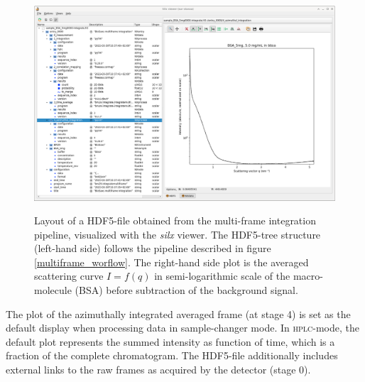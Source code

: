 \documentclass[preprint]{iucr}              %
\begin{document}
\begin{figure}
     \caption{Layout of a HDF5-file obtained from the multi-frame integration pipeline, visualized with the \textit{silx} viewer.
     The HDF5-tree structure (left-hand side) follows the pipeline described in figure \ref{multiframe_worflow}.
     The right-hand side plot is the averaged scattering curve $I=f(q)$ in semi-logarithmic scale of the macro-molecule (BSA) before subtraction of the background signal.}
     \includegraphics[width=12cm]{multiframe.eps}
     \label{multiframe}
\end{figure}

The plot of the azimuthally integrated averaged frame (at stage 4) is set as the default display  when processing data in sample-changer mode.
In \textsc{hplc}-mode, the default plot represents the summed intensity as function of time, which is a fraction of the complete chromatogram. 
The HDF5-file additionally includes external links to the raw frames as acquired by the detector (stage 0).
\end{document}
